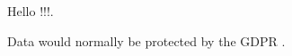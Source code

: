 \documentclass{article}
\begin{document}
  Hello !!!\cite{greenwade93}.
  
  Data would normally be protected by the GDPR \cite{gdpr}.
  
  \printbibliography
\end{document}
